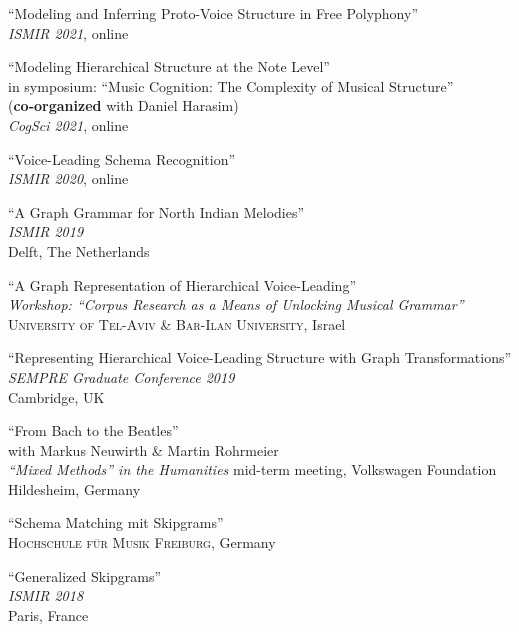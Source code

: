 \documentclass[10pt]{scrartcl}
\newcommand{\margintext}[1]{\marginpar{\raggedleft\itshape\small#1}}
\newcommand{\entry}[1]{\vphantom{x}\margintext{#1}}
\begin{document}
\entry{2021}%
\contrib \poster \enquote{Modeling and Inferring Proto-Voice Structure in Free Polyphony}
\\
\textit{ISMIR 2021}, online

\contrib \enquote{Modeling Hierarchical Structure at the Note Level}
\\
in symposium: \enquote{Music Cognition: The Complexity of Musical Structure}\\
(\textbf{co-organized} with Daniel Harasim)\\
\textit{CogSci 2021}, online

\entry{2020}%
\contrib \poster \enquote{Voice-Leading Schema Recognition}
\\
\textit{ISMIR 2020}, online

\entry{2019}%
\contrib \poster \enquote{A Graph Grammar for North Indian Melodies}
\\
\textit{ISMIR 2019}\\
Delft, The Netherlands

\invited \enquote{A Graph Representation of Hierarchical Voice-Leading}
\\
\textit{Workshop: \enquote{Corpus Research as a Means of Unlocking Musical Grammar}}\\
\textsc{University of Tel-Aviv \& Bar-Ilan University}, Israel

\poster \enquote{Representing Hierarchical Voice-Leading Structure with Graph Transformations}\\
\textit{SEMPRE Graduate Conference 2019}\\
Cambridge, UK

\contrib \enquote{From Bach to the Beatles}
\\
with Markus Neuwirth \& Martin Rohrmeier\\
\textit{\enquote{Mixed Methods} in the Humanities} mid-term meeting, Volkswagen Foundation\\
Hildesheim, Germany

\invited \enquote{Schema Matching mit Skipgrams}
\\
\textsc{Hochschule für Musik Freiburg}, Germany

\entry{2018}%
\contrib \poster \enquote{Generalized Skipgrams}
\\
\textit{ISMIR 2018}\\
Paris, France
\end{document}
